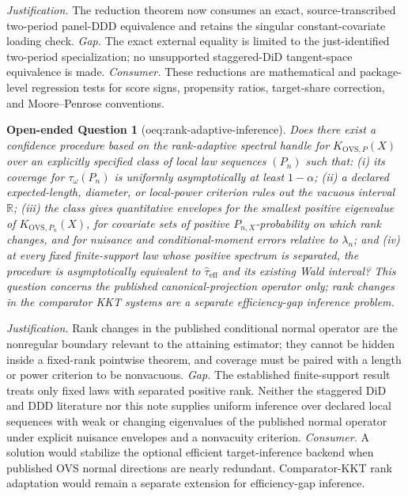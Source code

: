 \documentclass{article}
\newtheorem{openendedquestion}{Open-ended Question}
\begin{document}
\par\smallskip\noindent \textit{Justification.} The reduction theorem now consumes an exact, source-transcribed two-period panel-DDD equivalence and retains the singular constant-covariate loading check. \textit{Gap.} The exact external equality is limited to the just-identified two-period specialization; no unsupported staggered-DiD tangent-space equivalence is made. \textit{Consumer.} These reductions are mathematical and package-level regression tests for score signs, propensity ratios, target-share correction, and Moore--Penrose conventions.

\begin{openendedquestion}[oeq:rank-adaptive-inference]\label{oeq:rank-adaptive-inference}
Does there exist a confidence procedure based on the rank-adaptive spectral handle for \(K_{\mathrm{OVS},P}(X)\) over an explicitly specified class of local law sequences \((P_n)\) such that: (i) its coverage for \(\tau_\omega(P_n)\) is uniformly asymptotically at least \(1-\alpha\); (ii) a declared expected-length, diameter, or local-power criterion rules out the vacuous interval \(\mathbb R\); (iii) the class gives quantitative envelopes for the smallest positive eigenvalue of \(K_{\mathrm{OVS},P_n}(X)\), for covariate sets of positive \(P_{n,X}\)-probability on which rank changes, and for nuisance and conditional-moment errors relative to \(\lambda_n\); and (iv) at every fixed finite-support law whose positive spectrum is separated, the procedure is asymptotically equivalent to \(\widehat\tau_{\mathrm{eff}}\) and its existing Wald interval?  This question concerns the published canonical-projection operator only; rank changes in the comparator KKT systems are a separate efficiency-gap inference problem.
\end{openendedquestion}
\par\smallskip\noindent \textit{Justification.} Rank changes in the published conditional normal operator are the nonregular boundary relevant to the attaining estimator; they cannot be hidden inside a fixed-rank pointwise theorem, and coverage must be paired with a length or power criterion to be nonvacuous. \textit{Gap.} The established finite-support result treats only fixed laws with separated positive rank.  Neither the staggered DiD and DDD literature nor this note supplies uniform inference over declared local sequences with weak or changing eigenvalues of the published normal operator under explicit nuisance envelopes and a nonvacuity criterion. \textit{Consumer.} A solution would stabilize the optional efficient target-inference backend when published OVS normal directions are nearly redundant.  Comparator-KKT rank adaptation would remain a separate extension for efficiency-gap inference.
\end{document}
